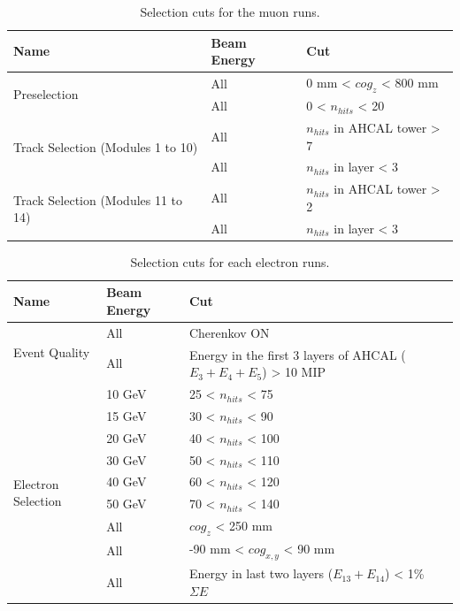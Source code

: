 \documentclass{JINST}
\begin{document}
\begin{table}[htb!]
  \centering
  \caption{Selection cuts for the muon runs.}
  \label{table:muon_sel}
  \begin{tabular}{@{}lll@{}}
    \toprule
    \multicolumn{1}{l}{\textbf{Name}} & \textbf{Beam Energy} & \textbf{Cut}\\
    \midrule
    \multirow{2}{*}{Preselection}& All & 0 mm < $cog_{z}$ < 800 mm\\& All & 0 < $n_{hits}$ < 20 \\
    \midrule
    \multirow{2}{*}{Track Selection (Modules 1 to 10)}& All & $n_{hits}$ in AHCAL tower > 7 \\& All & $n_{hits}$ in layer < 3 \\
    \midrule
    \multirow{2}{*}{Track Selection (Modules 11 to 14)}& All & $n_{hits}$ in AHCAL tower > 2 \\& All & $n_{hits}$ in layer < 3 \\
    \bottomrule
  \end{tabular}
\end{table}

\begin{table}[htb!]
  \centering
  \caption{Selection cuts for each electron runs.}
  \label{table:electron_sel}
  \begin{tabular}{@{}lll@{}}
    \toprule
    \multicolumn{1}{l}{\textbf{Name}} & \textbf{Beam Energy} & \textbf{Cut}\\
    \midrule
    \multirow{2}{*}{Event Quality}& All & Cherenkov ON\\& All & Energy in the first 3 layers of AHCAL ($E_3 + E_4 + E_5$) > 10 MIP \\
    \midrule
    \multirow{9}{*}{Electron Selection}& 10 GeV & 25 < $n_{hits}$ < 75 \\& 15 GeV & 30 < $n_{hits}$ < 90 \\& 20 GeV & 40 < $n_{hits}$ < 100 \\& 30 GeV & 50 < $n_{hits}$ < 110 \\& 40 GeV & 60 < $n_{hits}$ < 120 \\& 50 GeV & 70 < $n_{hits}$ < 140 \\& All & $cog_{z}$ < 250 mm\\& All & -90 mm < $cog_{x, y}$ < 90 mm \\& All & Energy in last two layers ($E_{13} + E_{14}$) < 1\% $\Sigma E$ \\
    \bottomrule
  \end{tabular}
\end{table}
\end{document}
